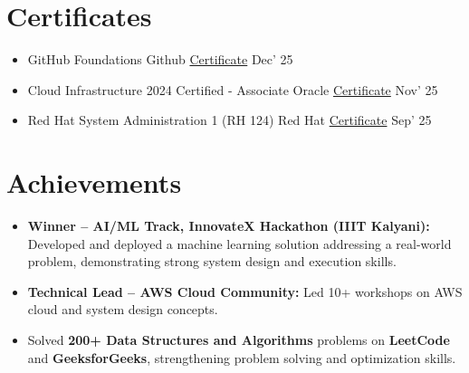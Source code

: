 \documentclass[10pt, a4paper]{article}
\begin{document}
\section{Certificates}

\begin{itemize}[itemsep=5pt]
  \item GitHub Foundations \textbar{} Github \textbar{} \href{https://github.com/anubhavxdev}{\textcolor{linknavy}{Certificate}}
        \hfill {\fontsize{8.5pt}{10pt}\selectfont Dec' 25}
  \item Cloud Infrastructure 2024 Certified - Associate \textbar{} Oracle \textbar{} \href{https://github.com/anubhavxdev}{\textcolor{linknavy}{Certificate}}
        \hfill {\fontsize{8.5pt}{10pt}\selectfont Nov' 25}
  \item Red Hat System Administration 1 (RH 124) \textbar{} Red Hat \textbar{} \href{https://github.com/anubhavxdev}{\textcolor{linknavy}{Certificate}}
        \hfill {\fontsize{8.5pt}{10pt}\selectfont Sep' 25}
\end{itemize}

\section{Achievements}

\begin{itemize}
  \item \textbf{Winner -- AI/ML Track, InnovateX Hackathon (IIIT Kalyani):} Developed and deployed a machine learning solution addressing a real-world problem, demonstrating strong system design and execution skills.
  \item \textbf{Technical Lead -- AWS Cloud Community:} Led 10+ workshops on AWS cloud and system design concepts.
  \item Solved \textbf{200+ Data Structures and Algorithms} problems on \textbf{LeetCode} and \textbf{GeeksforGeeks}, strengthening problem solving and optimization skills.
\end{itemize}

\end{document}
